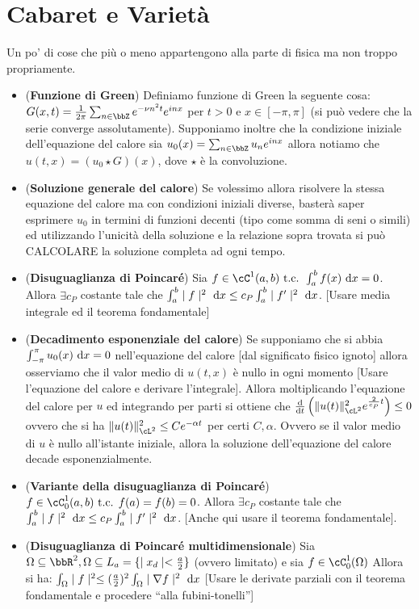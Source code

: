 \documentclass[a4paper,NoNotes,GeneralMath]{stdmdoc}
\newcommand{\intpie}{\int_{-\pi}^\pi }
\newcommand{\fractopie}{\frac{1}{2\pi}}
\begin{document}
        \section*{Cabaret e Varietà}
        Un po' di cose che più o meno appartengono alla parte di fisica ma non troppo propriamente.
        \begin{itemize}
        \item ({\bf Funzione di Green}) Definiamo funzione di Green la seguente cosa: $G(x, t) = \fractopie \sum_{n \in \bbZ} e^{-\nu n^2 t} e^{inx}$ per $t > 0$ e $x \in [-\pi, \pi]$ (si può vedere che la serie converge assolutamente). Supponiamo inoltre che la condizione iniziale dell'equazione del calore sia $u_0(x) = \sum_{n \in \bbZ} u_n e^{inx}$ allora notiamo che $u(t, x) = (u_0 \star G)(x)$, dove $\star$ è la convoluzione.
        \item ({\bf Soluzione generale del calore}) Se volessimo allora risolvere la stessa equazione del calore ma con condizioni iniziali diverse, basterà saper esprimere $u_0$ in termini di funzioni decenti (tipo come somma di seni o simili) ed utilizzando l'unicità della soluzione e la relazione sopra trovata si può CALCOLARE la soluzione completa ad ogni tempo.
        \item ({\bf Disuguaglianza di Poincaré}) Sia $f \in \cC^1(a,b) \tc \int_a^b f(x) \de x = 0$. Allora $\exists c_P$ costante tale che $\int_a^b \abs{f}^2 \de x \le c_P \int_a^b \abs{f'}^2 \de x$. [Usare media integrale ed il teorema fondamentale]
        \item ({\bf Decadimento esponenziale del calore}) Se supponiamo che si abbia $\intpie u_0(x) \de x = 0$ nell'equazione del calore [dal significato fisico ignoto] allora osserviamo che il valor medio di $u(t,x)$ è nullo in ogni momento [Usare l'equazione del calore e derivare l'integrale]. Allora moltiplicando l'equazione del calore per $u$ ed integrando per parti si ottiene che $\de{}{t} \left( \norm{u(t)}^2_{\cL^2} e^{\frac{2}{c_P}t} \right) \le 0$ ovvero che si ha $\norm{u(t)}^2_{\cL^2} \le C e^{-\alpha t}$ per certi $C, \alpha$. Ovvero se il valor medio di $u$ è nullo all'istante iniziale, allora la soluzione dell'equazione del calore decade esponenzialmente.
        \item ({\bf Variante della disuguaglianza di Poincaré}) $f \in \cC^1_0(a, b) \tc f(a) = f(b) = 0$. Allora $\exists c_P$ costante tale che $\int_a^b \abs{f}^2 \de x \le c_P \int_a^b \abs{f'}^2 \de x$. [Anche qui usare il teorema fondamentale].
        \item ({\bf Disuguaglianza di Poincaré multidimensionale}) Sia $\Omega \subseteq \bbR^2, \Omega \subseteq L_a = \{ \abs{x_d} < \frac{a}{2} \}$ (ovvero limitato) e sia $f \in \cC^1_0(\Omega)$ Allora si ha: $ \int_\Omega \abs{f}^2 \le (\frac{a}{2})^2 \int_\Omega \abs{\nabla f}^2 \de x $ [Usare le derivate parziali con il teorema fondamentale e procedere ``alla fubini-tonelli'']

\end{itemize}
\end{document}
